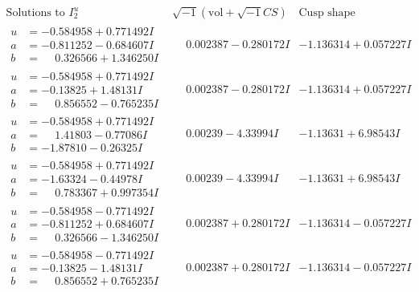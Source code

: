 \documentclass[1p]{elsarticle_modified}
\theoremstyle{definition}
\newcommand{\I}{\sqrt{-1}}
\begin{document}
$$\begin{array}{c|c|c}  
\text{Solutions to }I^u_{2}& \I (\text{vol} + \sqrt{-1}CS) & \text{Cusp shape}\\
 \hline 
\begin{aligned}
u &= -0.584958 + 0.771492 I \\
a &= -0.811252 - 0.684607 I \\
b &= \phantom{-}0.326566 + 1.346250 I\end{aligned}
 & \phantom{-}0.002387 - 0.280172 I & -1.136314 + 0.057227 I \\ \hline\begin{aligned}
u &= -0.584958 + 0.771492 I \\
a &= -0.13825 + 1.48131 I \\
b &= \phantom{-}0.856552 - 0.765235 I\end{aligned}
 & \phantom{-}0.002387 - 0.280172 I & -1.136314 + 0.057227 I \\ \hline\begin{aligned}
u &= -0.584958 + 0.771492 I \\
a &= \phantom{-}1.41803 - 0.77086 I \\
b &= -1.87810 - 0.26325 I\end{aligned}
 & \phantom{-}0.00239 - 4.33994 I & -1.13631 + 6.98543 I \\ \hline\begin{aligned}
u &= -0.584958 + 0.771492 I \\
a &= -1.63324 - 0.44978 I \\
b &= \phantom{-}0.783367 + 0.997354 I\end{aligned}
 & \phantom{-}0.00239 - 4.33994 I & -1.13631 + 6.98543 I \\ \hline\begin{aligned}
u &= -0.584958 - 0.771492 I \\
a &= -0.811252 + 0.684607 I \\
b &= \phantom{-}0.326566 - 1.346250 I\end{aligned}
 & \phantom{-}0.002387 + 0.280172 I & -1.136314 - 0.057227 I \\ \hline\begin{aligned}
u &= -0.584958 - 0.771492 I \\
a &= -0.13825 - 1.48131 I \\
b &= \phantom{-}0.856552 + 0.765235 I\end{aligned}
 & \phantom{-}0.002387 + 0.280172 I & -1.136314 - 0.057227 I \\ \hline\begin{aligned}

\end{aligned}
\end{array}$$
\end{document}
